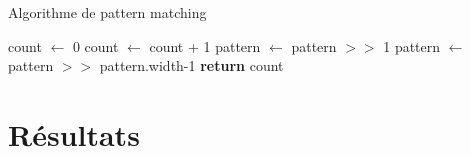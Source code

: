 \documentclass{article}
\begin{document}
\begin{algorithm}
\caption{Algorithme de pattern matching}\label{pattern_matching}
\begin{algorithmic}[1]
	\State count $\gets$ 0
			 
				\State count $\gets$ count + 1
			\EndIf
			\State pattern $\gets$ pattern $>>$ 1 
		\EndFor
		\State pattern $\gets$ pattern $>>$ pattern.width-1
	\EndFor
	\State \textbf{return} count
\EndProcedure
\end{algorithmic}
\end{algorithm}


\pagebreak
\section{Résultats}

\pagebreak
\end{document}
